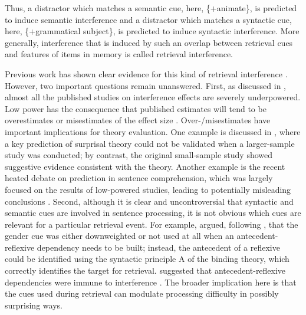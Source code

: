 \documentclass[a4paper, man, floatsintext]{apa7}
\begin{document}
Thus, a distractor which matches a semantic cue, here, \{+animate\}, is predicted to induce semantic interference and a distractor which matches a syntactic cue, here, \{+grammatical subject\}, is predicted to induce syntactic interference. More generally, interference that is induced by such an overlap between retrieval cues and features of items in memory is called retrieval interference. 

Previous work has shown clear evidence for this kind of retrieval interference \parencite{vandyke07, vandyke_mcelree06, vandyke_mcelree2011, nicenboim,  vandyke_lewis03,jaeger_etal_2017}.
However, two important questions remain unanswered. First, as discussed in \cite{jaeger_etal_2017}, almost all the published studies on interference effects are severely underpowered. Low power has the consequence that published estimates will tend to be overestimates or misestimates of the effect size \parencite{vasishth2018_signficancefilter}. Over-/misestimates have important implications for theory evaluation. One example is discussed in \cite{vasishth2018_signficancefilter}, where a key prediction of surprisal theory \parencite{levy&keller_2013} could not be validated when a larger-sample study was conducted; by contrast, the original small-sample study  \parencite{levy&keller_2013} showed suggestive evidence consistent with the theory. Another example is the recent heated debate on prediction in sentence comprehension, which was largely focused on the results of low-powered studies, leading to potentially misleading conclusions \parencite{nicenboim_etal_2020}.
Second, although it is clear and uncontroversial  \parencite[e.g.,][]{vandyke07,mertzen} that syntactic and semantic cues are involved in sentence processing, it is not obvious which cues are relevant for a particular retrieval event. For example, \cite{dillon2013} argued, following \cite{Sturt2003}, that the gender cue was either downweighted or not used at all when an antecedent-reflexive dependency needs to be built; instead, the antecedent of a reflexive could be identified using the syntactic principle A of the binding theory, which correctly identifies the target for retrieval.  \cite{dillon2013} suggested that antecedent-reflexive dependencies were immune to interference \parencite[cf. ][]{jaeger_etal_2020,yadav2021individual}. The broader implication here is that the cues used during retrieval can modulate processing difficulty in possibly surprising ways.
\end{document}
